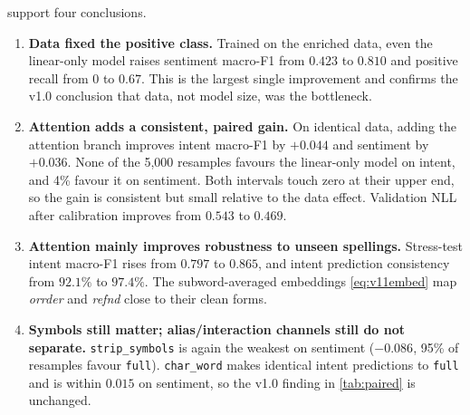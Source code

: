 \documentclass[11pt,a4paper]{article}
\theoremstyle{remark}
\newcommand{\lbl}[1]{\texttt{#1}}                      %
\newcommand{\hi}[1]{\textit{#1}}                       %
\begin{document}
 support four conclusions.
\begin{enumerate}
  \item \textbf{Data fixed the positive class.} Trained on the enriched data,
        even the linear-only model raises sentiment macro-F1 from $0.423$ to
        $0.810$ and positive recall from $0$ to $0.67$. This is the largest
        single improvement and confirms the v1.0 conclusion that data, not
        model size, was the bottleneck.
  \item \textbf{Attention adds a consistent, paired gain.} On identical data,
        adding the attention branch improves intent macro-F1 by $+0.044$ and
        sentiment by $+0.036$. None of the 5{,}000 resamples favours the
        linear-only model on intent, and 4\% favour it on sentiment. Both
        intervals touch zero at their upper end, so the gain is consistent
        but small relative to the data effect. Validation NLL after
        calibration improves from $0.543$ to $0.469$.
  \item \textbf{Attention mainly improves robustness to unseen spellings.}
        Stress-test intent macro-F1 rises from $0.797$ to $0.865$, and intent
        prediction consistency from $92.1\%$ to $97.4\%$. The subword-averaged
        embeddings \eqref{eq:v11embed} map \hi{orrder} and \hi{refnd} close
        to their clean forms.
  \item \textbf{Symbols still matter; alias/interaction channels still do not
        separate.} \lbl{strip\_symbols} is again the weakest on sentiment
        ($-0.086$, 95\% of resamples favour \lbl{full}). \lbl{char\_word}
        makes identical intent predictions to \lbl{full} and is within
        $0.015$ on sentiment, so the v1.0 finding in \cref{tab:paired} is
        unchanged.
\end{enumerate}
\end{document}
